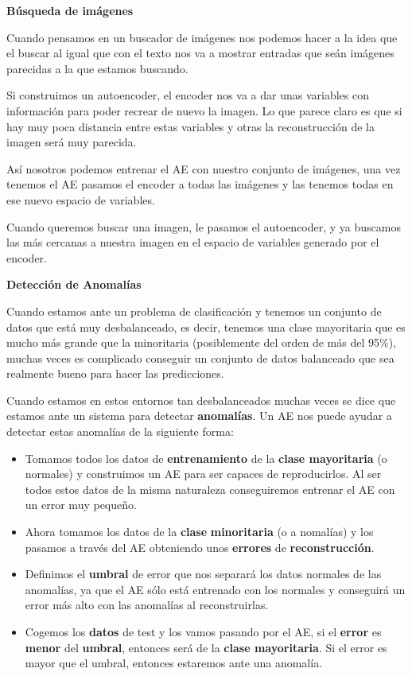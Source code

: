 \documentclass[
  a4paper,
  DIV=11,
  numbers=noendperiod]{scrreprt}
\providecommand{\tightlist}{%
  \setlength{\itemsep}{0pt}\setlength{\parskip}{0pt}}\usepackage{longtable,booktabs,array}
\begin{document}
\textbf{Búsqueda de imágenes}

Cuando pensamos en un buscador de imágenes nos podemos hacer a la idea
que el buscar al igual que con el texto nos va a mostrar entradas que
seán imágenes parecidas a la que estamos buscando.

Si construimos un autoencoder, el encoder nos va a dar unas variables
con información para poder recrear de nuevo la imagen. Lo que parece
claro es que si hay muy poca distancia entre estas variables y otras la
reconstrucción de la imagen será muy parecida.

Así nosotros podemos entrenar el AE con nuestro conjunto de imágenes,
una vez tenemos el AE pasamos el encoder a todas las imágenes y las
tenemos todas en ese nuevo espacio de variables.

Cuando queremos buscar una imagen, le pasamos el autoencoder, y ya
buscamos las más cercanas a nuestra imagen en el espacio de variables
generado por el encoder.

\textbf{Detección de Anomalías}

Cuando estamos ante un problema de clasificación y tenemos un conjunto
de datos que está muy desbalanceado, es decir, tenemos una clase
mayoritaria que es mucho más grande que la minoritaria (posiblemente del
orden de más del 95\%), muchas veces es complicado conseguir un conjunto
de datos balanceado que sea realmente bueno para hacer las predicciones.

Cuando estamos en estos entornos tan desbalanceados muchas veces se dice
que estamos ante un sistema para detectar \textbf{anomalías}. Un AE nos
puede ayudar a detectar estas anomalías de la siguiente forma:

\begin{itemize}
\tightlist
\item
  Tomamos todos los datos de \textbf{entrenamiento} de la \textbf{clase
  mayoritaria} (o normales) y construimos un AE para ser capaces de
  reproducirlos. Al ser todos estos datos de la misma naturaleza
  conseguiremos entrenar el AE con un error muy pequeño.
\item
  Ahora tomamos los datos de la \textbf{clase} \textbf{minoritaria} (o a
  nomalías) y los pasamos a través del AE obteniendo unos
  \textbf{errores} de \textbf{reconstrucción}.
\item
  Definimos el \textbf{umbral} de error que nos separará los datos
  normales de las anomalías, ya que el AE sólo está entrenado con los
  normales y conseguirá un error más alto con las anomalías al
  reconstruirlas.
\item
  Cogemos los \textbf{datos} de test y los vamos pasando por el AE, si
  el \textbf{error} es \textbf{menor} del \textbf{umbral}, entonces será
  de la \textbf{clase mayoritaria}. Si el error es mayor que el umbral,
  entonces estaremos ante una anomalía.
\end{itemize}
\end{document}
